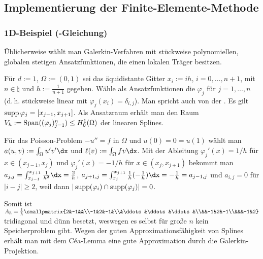\subsection{%
    Implementierung der Finite-Elemente-Methode%
}

\subsubsection{%
    1D-Beispiel (-Gleichung)%
}

\begin{Bem}
    Üblicherweise wählt man Galerkin-Verfahren mit
    stückweise polynomiellen, globalen stetigen Ansatzfunktionen, die einen lokalen Träger
    besitzen.
\end{Bem}

\begin{Bsp}
    Für $d := 1$, $\Omega := (0, 1)$
    sei das äquidistante Gitter
    $x_i := ih$, $i = 0, \dotsc, n + 1$, mit $n \in \natural$ und $h := \frac{1}{n+1}$ gegeben.
    Wähle als Ansatzfunktionen die 
    $\varphi_j$ für $j = 1, \dotsc, n$
    (d.\,h. stückweise linear mit $\varphi_j(x_i) = \delta_{i,j}$).
    Man spricht auch von der .
    Es gilt $\operatorname{supp}\varphi_j = [x_{j-1}, x_{j+1}]$.
    Als Ansatzraum erhält man den Raum $V_h := \operatorname{Span}((\varphi_j)_{j=1}^n) \le H^1_0(\Omega)$
    der linearen Splines.
    
    Für das Poisson-Problem $-u'' = f$ in $\Omega$ und $u(0) = 0 = u(1)$ wählt man
    $a(u, v) := \int_\Omega u'v'\dx$ und $\ell(v) := \int_\Omega fv\dx$.
    Mit der Ableitung $\varphi_j'(x) = 1/h$ für $x \in (x_{j-1}, x_j)$ und
    $\varphi_j'(x) = -1/h$ für $x \in (x_j, x_{j+1})$ bekommt man
    $a_{j,j} = \int_{x_{j-1}}^{x_{j+1}} \frac{1}{h^2} \dx = \frac{2}{h}$,
    $a_{j+1,j} = \int_{x_j}^{x_{j+1}} \frac{1}{h} (-\frac{1}{h}) \dx = -\frac{1}{h} = a_{j-1,j}$
    und $a_{i,j} = 0$ für $|i - j| \ge 2$, weil dann
    $|\operatorname{supp}(\varphi_i) \cap \operatorname{supp}(\varphi_j)| = 0$.
    
    Somit ist $A_h = \frac{1}{h}
    \smallpmatrix{2&-1&&\\-1&2&-1&\\&\ddots&\ddots&\ddots&\\&&-1&2&-1\\&&&-1&2}$
    tridiagonal und dünn besetzt,
    weswegen es selbst für große $n$ kein Speicherproblem gibt.
    Wegen der guten Approximationsfähigkeit von Splines erhält man mit dem
    Céa-Lemma eine gute Approximation durch die Galerkin-Projektion.
\end{Bsp}

